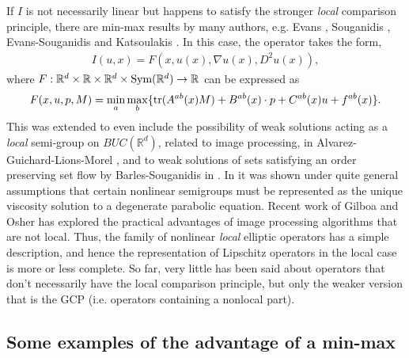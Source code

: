 \documentclass[11pt,reqno]{amsart}
\numberwithin{equation}{section}
\theoremstyle{plain}
\def\real{{\mathbb R}}
\def\Tr{\textnormal{tr}}
\begin{document}
 If $I$ is not necessarily linear but happens to satisfy the stronger \emph{local} comparison principle,  there are min-max results by many authors, e.g. Evans \cite{Evans-1984MinMaxRepresentations}, Souganidis \cite{Souganidis-1985MaxMinRep}, Evans-Souganidis \cite{EvansSoug-84DiffGameRepresentation} and Katsoulakis \cite{Katsou-1995RepresentationDegParEq}. In this case, the operator takes the form,
\begin{align*}
  I(u,x) = F(x,u(x),\nabla u(x),D^2u(x)),	
\end{align*}	
where $F: \mathbb{R}^d\times\mathbb{R}  \times \mathbb{R}^d\times \textnormal{Sym}(\mathbb{R}^d) \to \mathbb{R}$ can be expressed as
\begin{align*}
  F(x,u,p,M) = \min\limits_{a}\max \limits_{b} \{ \Tr(A^{ab}(x)M) + B^{ab}(x)\cdot p + C^{ab}(x)u+f^{ab}(x) \}.
\end{align*}
This was extended to even include the possibility of weak solutions acting as a \emph{local} semi-group on $BUC(\real^d)$, related to image processing, in Alvarez-Guichard-Lions-Morel \cite{AlvarezLionsGuichardMorel-1993AxiomsImageProARMA}, and to weak solutions of sets satisfying an order preserving set flow by Barles-Souganidis in \cite{BarlesSouganidis-1998NewApproachFrontsARMA}.  In \cite{AlvarezLionsGuichardMorel-1993AxiomsImageProARMA} it was shown under quite general assumptions that certain nonlinear semigroups must be represented as the unique viscosity solution to a degenerate parabolic equation.   Recent work of Gilboa and Osher \cite{GiOs-2008NLImagePro} has explored the practical advantages of image processing algorithms that are not local.
Thus, the family of nonlinear \emph{local} elliptic operators has a simple description, and hence the representation of Lipschitz operators in the local case is more or less complete.  So far, very little has been said about operators that don't necessarily have the local comparison principle, but only the weaker version that is the GCP (i.e. operators containing a nonlocal part).  





\subsection{Some examples of the advantage of a min-max}\label{sec:ExamplesThatUseMinMaxLocal}
\end{document}

